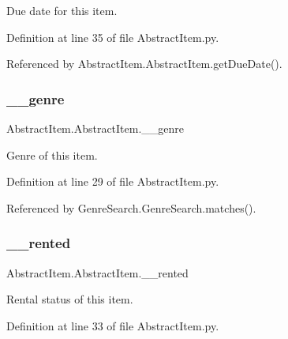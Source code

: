 Due date for this item. 



Definition at line 35 of file Abstract\+Item.\+py.



Referenced by Abstract\+Item.\+Abstract\+Item.\+get\+Due\+Date().

\mbox{\label{classAbstractItem_1_1AbstractItem_a9a18f410b1160da5c633a92ff228e5ee}} 
\subsubsection{\texorpdfstring{\+\_\+\+\_\+genre}{\_\_genre}}
{\footnotesize\ttfamily Abstract\+Item.\+Abstract\+Item.\+\_\+\+\_\+genre\hspace{0.3cm}{\ttfamily [private]}}



Genre of this item. 



Definition at line 29 of file Abstract\+Item.\+py.



Referenced by Genre\+Search.\+Genre\+Search.\+matches().

\mbox{\label{classAbstractItem_1_1AbstractItem_a5da9a42e491e8eb843fae960748ec7e7}} 
\subsubsection{\texorpdfstring{\+\_\+\+\_\+rented}{\_\_rented}}
{\footnotesize\ttfamily Abstract\+Item.\+Abstract\+Item.\+\_\+\+\_\+rented\hspace{0.3cm}{\ttfamily [private]}}



Rental status of this item. 



Definition at line 33 of file Abstract\+Item.\+py.



